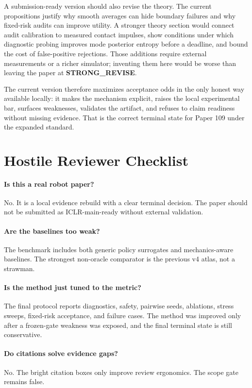\documentclass{article}
\newcommand{\terminal}{\textbf{STRONG\_REVISE}}
\begin{document}
A submission-ready version should also revise the theory. The current propositions justify why smooth averages can hide boundary failures and why fixed-risk audits can improve utility. A stronger theory section would connect audit calibration to measured contact impulses, show conditions under which diagnostic probing improves mode posterior entropy before a deadline, and bound the cost of false-positive rejections. Those additions require external measurements or a richer simulator; inventing them here would be worse than leaving the paper at \terminal.

The current version therefore maximizes acceptance odds in the only honest way available locally: it makes the mechanism explicit, raises the local experimental bar, surfaces weaknesses, validates the artifact, and refuses to claim readiness without missing evidence. That is the correct terminal state for Paper 109 under the expanded standard.

\section{Hostile Reviewer Checklist}
\paragraph{Is this a real robot paper?} No. It is a local evidence rebuild with a clear terminal decision. The paper should not be submitted as ICLR-main-ready without external validation.

\paragraph{Are the baselines too weak?} The benchmark includes both generic policy surrogates and mechanics-aware baselines. The strongest non-oracle comparator is the previous v4 atlas, not a strawman.

\paragraph{Is the method just tuned to the metric?} The final protocol reports diagnostics, safety, pairwise seeds, ablations, stress sweeps, fixed-risk acceptance, and failure cases. The method was improved only after a frozen-gate weakness was exposed, and the final terminal state is still conservative.

\paragraph{Do citations solve evidence gaps?} No. The bright citation boxes only improve review ergonomics. The scope gate remains false.
\end{document}
